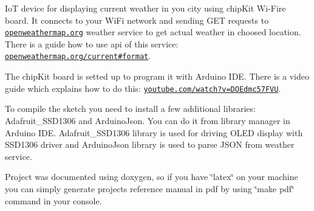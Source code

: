 IoT device for displaying current weather in you city using chip\+Kit Wi-\/\+Fire board. It connects to your Wi\+Fi network and sending G\+ET requests to \href{https://openweathermap.org/}{\tt openweathermap.\+org} weather service to get actual weather in choosed location. There is a guide how to use api of this service\+: \href{https://openweathermap.org/current#format}{\tt openweathermap.\+org/current\#format}.

The chip\+Kit board is setted up to program it with Arduino I\+DE. There is a video guide which explains how to do this\+: \href{https://www.youtube.com/watch?v=DOEdmc57FVU}{\tt youtube.\+com/watch?v=D\+O\+Edmc57\+F\+VU}.

To compile the sketch you need to install a few additional libraries\+: Adafruit\+\_\+\+S\+S\+D1306 and Arduino\+Json. You can do it from library manager in Arduino I\+DE. Adafruit\+\_\+\+S\+S\+D1306 library is used for driving O\+L\+ED display with S\+S\+D1306 driver and Arduino\+Json library is used to parse J\+S\+ON from weather service.

Project was documented using doxygen, so if you have \char`\"{}latex\char`\"{} on your machine you can simply generate project\textquotesingle{}s reference manual in pdf by using \char`\"{}make pdf\char`\"{} command in your console.

